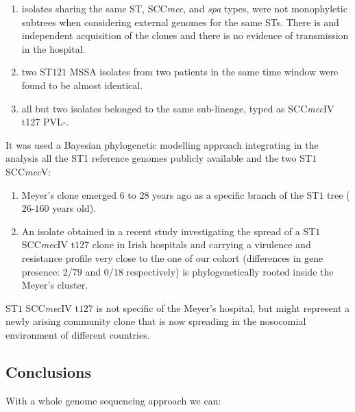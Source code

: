 \begin{multicols}{2}
    \begin{enumerate}
        \item isolates sharing the same ST, SCC\emph{mec}, and \emph{spa} types, were not monophyletic subtrees when considering external genomes for the same STs.
            There is and independent acquisition of the clones and there is no evidence of transmission in the hospital.
        \item two ST$121$ MSSA isolates from two patients in the same time window were found to be almost identical.
        \item all but two isolates belonged to the same sub-lineage, typed as SCC\emph{mec}IV t127 PVL-.
    \end{enumerate}
\end{multicols}

It was used a Bayesian phylogenetic modelling approach integrating in the analysis all the ST1 reference genomes publicly available and the two ST$1$ SCC\emph{mec}V:

\begin{multicols}{2}
    \begin{enumerate}
        \item Meyer's clone emerged $6$ to $28$ years ago as a specific branch of the ST$1$ tree ($26$-$160$ years old).
        \item An isolate obtained in a recent study investigating the spread of a ST$1$ SCC\emph{mec}IV t$127$ clone in Irish hospitals and carrying a virulence and resistance profile very close to the one of our cohort (differences in gene presence: $2$/$79$ and $0$/$18$ respectively) is phylogenetically  rooted inside the Meyer's cluster.
    \end{enumerate}
\end{multicols}

ST$1$ SCC\emph{mec}IV t$127$ is not specific of the Meyer's hospital, but might represent a newly arising community clone that is now spreading in the nosocomial environment of different countries.

\subsection{Conclusions}
With a whole genome sequencing approach we can:

